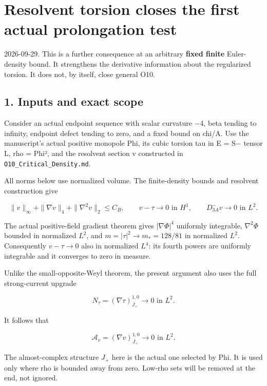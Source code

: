 \hypertarget{o10prolong:resolvent-torsion-closes-the-first-actual-prolongation-test}{%
\section{Resolvent torsion closes the first actual prolongation
test}\label{o10prolong:resolvent-torsion-closes-the-first-actual-prolongation-test}}

2026-09-29. This is a further consequence at an arbitrary \textbf{fixed
finite} Euler-density bound. It strengthens the derivative information
about the regularized torsion. It does not, by itself, close general
O10.

\hypertarget{o10prolong:inputs-and-exact-scope}{%
\subsection{1. Inputs and exact scope}\label{o10prolong:inputs-and-exact-scope}}

Consider an actual endpoint sequence with scalar curvature −4, beta
tending to infinity, endpoint defect tending to zero, and a fixed bound
on chi/A. Use the manuscript's actual positive monopole Phi, its cubic
torsion tau in E = S− tensor L, rho = \textbar Phi\textbar², and the
resolvent section v constructed in \texttt{O10\_Critical\_Density.md}.

All norms below use normalized volume. The finite-density bounds and
resolvent construction give

\[
 \|v\|_\infty+\|\nabla v\|_4+\|\nabla^2v\|_2\le C_B,
 \qquad v-\tau\longrightarrow0\text{ in }H^1,
 \qquad D^-_{3A}v\longrightarrow0\text{ in }L^2.
\]

The actual positive-field gradient theorem gives \(|\nabla\Phi|^4\)
uniformly integrable, \(\nabla^2\Phi\) bounded in normalized \(L^2\),
and \(m=|\tau|^2\to m_*=128/81\) in normalized \(L^2\). Consequently
\(v-\tau\to0\) also in normalized \(L^4\): its fourth powers are
uniformly integrable and it converges to zero in measure.

Unlike the small-opposite-Weyl theorem, the present argument also uses
the full strong-current upgrade

\[
 N_\tau=(\nabla\tau)^{1,0}_{J_+}\longrightarrow0\text{ in }L^2.
\]

It follows that

\[
 \mathcal A_v=(\nabla v)^{1,0}_{J_+}\longrightarrow0\text{ in }L^2.
\tag{1}
\]

The almost-complex structure \(J_+\) here is the actual one selected by
Phi. It is used only where rho is bounded away from zero. Low-rho sets
will be removed at the end, not ignored.

